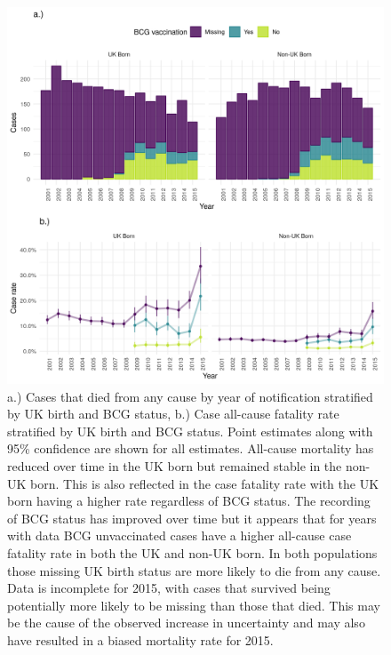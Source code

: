 \documentclass[11pt,twoside]{bristolthesis}
\begin{document}
  \begin{figure}
  
  {\centering \includegraphics[width=0.8\linewidth,]{chapters/tb-epi-england/figures/plot-all-mort-case-rate} 
  
  }
  
  \caption[a.) Cases that died from any cause by year of notification stratified by UK birth and BCG status, b.) Case all-cause fatality rate stratified by UK birth and BCG status.]{a.) Cases that died from any cause by year of notification stratified by UK birth and BCG status, b.) Case all-cause fatality rate stratified by UK birth and BCG status. Point estimates along with 95\% confidence are shown for all estimates. All-cause mortality has reduced over time in the UK born but remained stable in the non-UK born. This is also reflected in the case fatality rate with the UK born having a higher rate regardless of BCG status. The recording of BCG status has improved over time but it appears that for years with data BCG unvaccinated cases have a higher all-cause case fatality rate in both the UK and non-UK born. In both populations those missing UK birth status are more likely to die from any cause. Data is incomplete for 2015, with cases that survived being potentially more likely to be missing than those that died.  This may be the cause of the observed increase in uncertainty and may also have resulted in a biased mortality rate for 2015.}\label{fig:plot-all-mort-case-rate}
  \end{figure}
\end{document}
